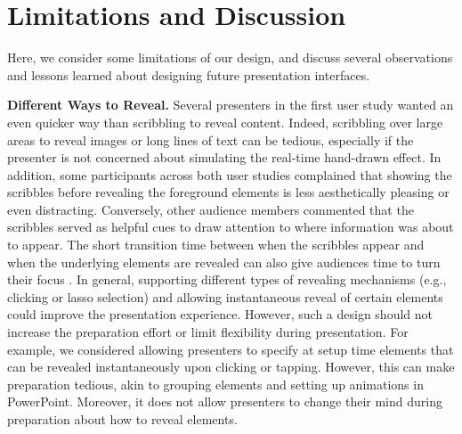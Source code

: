 \section{Limitations and Discussion}
Here, we consider some limitations of our design, and discuss several observations and lessons learned about designing future presentation interfaces.

\textbf{Different Ways to Reveal.}  Several presenters in the first user study wanted an even quicker way than scribbling to reveal content. Indeed, scribbling over large areas to reveal images or long lines of text can be tedious, especially if the presenter is not concerned about simulating the real-time hand-drawn effect. 
%
In addition, some participants across both user studies complained that showing the scribbles before revealing the foreground elements is less aesthetically pleasing or even distracting. Conversely, other audience members commented that the scribbles served as helpful cues to draw attention to where information was about to appear. The short transition time between when the scribbles appear and when the underlying elements are revealed can also give audiences time to turn their focus . 
%
In general, supporting different types of revealing mechanisms (e.g., clicking or lasso selection) and allowing instantaneous reveal of certain elements could improve the presentation experience. However, such a design should not increase the preparation effort or limit flexibility during presentation.
%
For example, we considered allowing presenters to specify at setup time elements that can be revealed instantaneously upon clicking or tapping. However, this can make preparation tedious, akin to grouping elements and setting up animations in PowerPoint. Moreover, it does not allow presenters to change their mind during preparation about how to reveal elements. 


